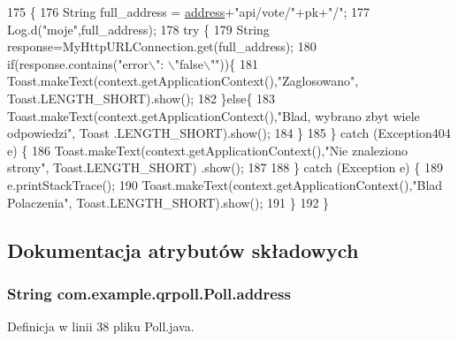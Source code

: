 \begin{DoxyCode}
175                                \{
176         String full\_address = \hyperlink{classcom_1_1example_1_1qrpoll_1_1_poll_a284d664b1db022d0fe8f089c4cad5ead}{address}+\textcolor{stringliteral}{"api/vote/"}+pk+\textcolor{stringliteral}{"/"};        
177         Log.d(\textcolor{stringliteral}{"moje"},full\_address);
178         \textcolor{keywordflow}{try} \{
179             String response=MyHttpURLConnection.get(full\_address);
180             \textcolor{keywordflow}{if}(response.contains(\textcolor{stringliteral}{"error\(\backslash\)": \(\backslash\)"false\(\backslash\)""}))\{
181                 Toast.makeText(context.getApplicationContext(),\textcolor{stringliteral}{"Zaglosowano"}, Toast.LENGTH\_SHORT).show();
182             \}\textcolor{keywordflow}{else}\{
183                 Toast.makeText(context.getApplicationContext(),\textcolor{stringliteral}{"Blad, wybrano zbyt wiele odpowiedzi"}, Toast
      .LENGTH\_SHORT).show();
184             \}
185         \} \textcolor{keywordflow}{catch} (Exception404 e) \{
186             Toast.makeText(context.getApplicationContext(),\textcolor{stringliteral}{"Nie znaleziono strony"}, Toast.LENGTH\_SHORT)
      .show();
187 
188         \} \textcolor{keywordflow}{catch} (Exception e) \{
189             e.printStackTrace();
190             Toast.makeText(context.getApplicationContext(),\textcolor{stringliteral}{"Blad Polaczenia"}, Toast.LENGTH\_SHORT).show();
191         \}
192     \}
\end{DoxyCode}


\subsection{Dokumentacja atrybutów składowych}
\hypertarget{classcom_1_1example_1_1qrpoll_1_1_poll_a284d664b1db022d0fe8f089c4cad5ead}{
\subsubsection[{address}]{\setlength{\rightskip}{0pt plus 5cm}String com.\+example.\+qrpoll.\+Poll.\+address\hspace{0.3cm}{\ttfamily [private]}}}\label{classcom_1_1example_1_1qrpoll_1_1_poll_a284d664b1db022d0fe8f089c4cad5ead}


Definicja w linii 38 pliku Poll.\+java.

